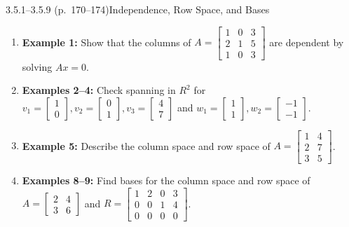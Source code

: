 \documentclass[11pt,a4paper,openany,oneside]{book}
\def\vect#1{#1}%
\def\mathbf#1{#1}%
\newcommand{\vect}[1]{\mathbf{#1}}
\numberwithin{equation}{chapter}
\begin{document}
\begin{example}{3.5.1--3.5.9 (p.\ 170--174)}{Independence, Row Space, and Bases}
\begin{enumerate}
\item \textbf{Example 1:} Show that the columns of $A = \begin{bmatrix}1 & 0 & 3\\2 & 1 & 5\\1 & 0 & 3\end{bmatrix}$ are dependent by solving $A\vect{x}=\vect{0}$.
\item \textbf{Examples 2--4:} Check spanning in $\mathbf{R}^2$ for $\vect{v}_1=\begin{bmatrix}1\\0\end{bmatrix}, \vect{v}_2=\begin{bmatrix}0\\1\end{bmatrix}, \vect{v}_3=\begin{bmatrix}4\\7\end{bmatrix}$ and $\vect{w}_1=\begin{bmatrix}1\\1\end{bmatrix}, \vect{w}_2=\begin{bmatrix}-1\\-1\end{bmatrix}$.
\item \textbf{Example 5:} Describe the column space and row space of $A = \begin{bmatrix}1 & 4\\2 & 7\\3 & 5\end{bmatrix}$.
\item \textbf{Examples 8--9:} Find bases for the column space and row space of $A = \begin{bmatrix}2 & 4\\3 & 6\end{bmatrix}$ and $R = \begin{bmatrix}1 & 2 & 0 & 3\\0 & 0 & 1 & 4\\0 & 0 & 0 & 0\end{bmatrix}$.
\end{enumerate}
\end{example}
\end{document}
